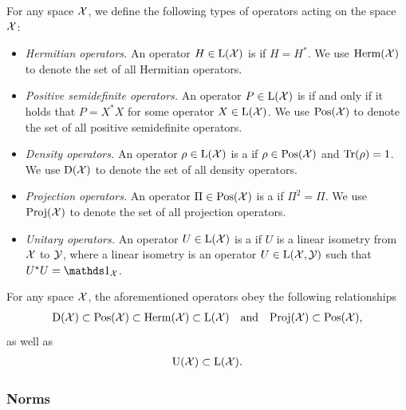For any space $\mathcal{X}$, we define the following types of operators acting on the space $\mathcal{X}$: 
\begin{itemize}
	\item {\it Hermitian operators.} An operator $H \in \mathrm{L}(\mathcal{X})$ is  if $H = H^*$. We use $\mathrm{Herm}(\mathcal{X})$ to denote the set of all Hermitian operators. 

	\item {\it Positive semidefinite operators.} An operator $P \in \mathrm{L}(\mathcal{X})$ is  if and only if it holds that $P = X^*X$ for some operator $X \in \mathrm{L}(\mathcal{X})$. We use $\mathrm{Pos}(\mathcal{X})$ to denote the set of all positive semidefinite operators. 
	
	\item {\it Density operators.} An operator $\rho \in \mathrm{L}(\mathcal{X})$ is a  if $\rho \in \mathrm{Pos}(\mathcal{X})$ and $\operatorname{Tr}(\rho) = 1$. We use $\mathrm{D}(\mathcal{X})$ to denote the set of all density operators. 
	
	\item {\it Projection operators.} An operator $\Pi \in \mathrm{Pos}(\mathcal{X})$ is a  if $\Pi^2 = \Pi$. We use $\mathrm{Proj}(\mathcal{X})$ to denote the set of all projection operators. 
	
	\item {\it Unitary operators.} An operator $U \in \mathrm{L}(\mathcal{X})$ is a  if $U$ is a linear isometry from $\mathcal{X}$ to $\mathcal{Y}$, where a linear isometry is an operator $U \in \mathrm{L}(\mathcal{X},\mathcal{Y})$ such that $U^*U = \I_{\X}$. 
\end{itemize}
For any space $\mathcal{X}$, the aforementioned operators obey the following relationships
\begin{align}
	\mathrm{D}(\mathcal{X}) \subset \mathrm{Pos}(\mathcal{X}) \subset \mathrm{Herm}(\mathcal{X}) \subset \mathrm{L}(\mathcal{X}) \quad \textnormal{and} \quad \mathrm{Proj}(\mathcal{X}) \subset \mathrm{Pos}(\mathcal{X}),
\end{align}
as well as 
\begin{align}
	\mathrm{U}(\mathcal{X}) \subset \mathrm{L}(\mathcal{X}).
\end{align}

\subsubsection*{Norms}

